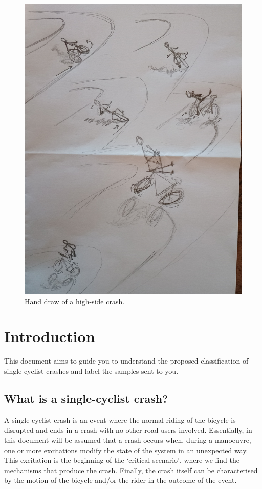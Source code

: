 \documentclass{article}
\begin{document}
\begin{figure}[h]
    \centering
    \includegraphics[width=\linewidth]{high-side-draw.jpg}
    \caption{Hand draw of a high-side crash.}
    \label{fig: highside}
\end{figure}




\section{Introduction}

This document aims to guide you to understand the proposed classification of single-cyclist crashes and label the samples sent to you.

\subsection{What is a single-cyclist crash?}

A single-cyclist crash is an event where the normal riding of the bicycle is disrupted and ends in a crash with no other road users involved.
%
Essentially, in this document will be assumed that a crash occurs when, during a manoeuvre, one or more excitations modify the state of the system in an unexpected way.
%
This excitation is the beginning of the `critical scenario', where we find the mechanisms that produce the crash.
%
Finally, the crash itself can be characterised by the motion of the bicycle and/or the rider in the outcome of the event.
\end{document}
